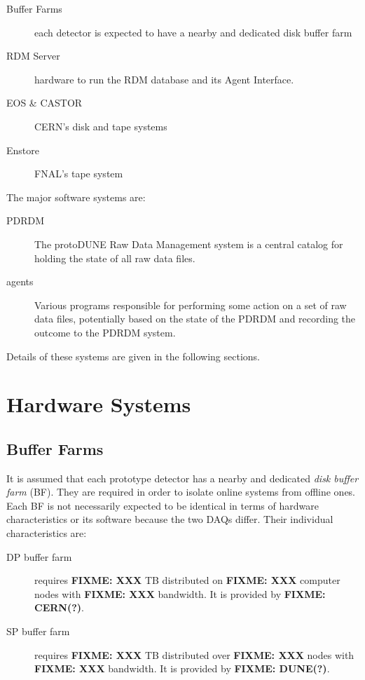 \documentclass[pdftex,12pt,letter]{article}
\newcommand{\fixme}[1]{\textbf{FIXME: #1}}
\begin{document}
\begin{description}
\item[Buffer Farms] each detector is expected to have a nearby and
  dedicated disk buffer farm
\item[RDM Server] hardware to run the RDM database and its Agent Interface.
\item[EOS \& CASTOR] CERN's disk and tape systems
\item[Enstore] FNAL's tape system

\end{description}

\noindent The major software systems are:

\begin{description}
\item[PDRDM] The protoDUNE Raw Data Management system is a central
  catalog for holding the state of all raw data files.
\item[agents] Various programs responsible for performing some action
  on a set of raw data files, potentially based on the state of the
  PDRDM and recording the outcome to the PDRDM system.
\end{description}

\noindent Details of these systems are given in the following sections.

\section{Hardware Systems}

\subsection{Buffer Farms}

It is assumed that each prototype detector has a nearby and dedicated
\textit{disk buffer farm} (BF).  They are required in order to isolate
online systems from offline ones.  Each BF is not necessarily expected
to be identical in terms of hardware characteristics or its software
because the two DAQs differ.  Their individual characteristics are:

\begin{description}
\item[DP buffer farm] requires \fixme{XXX} TB distributed on
  \fixme{XXX} computer nodes with \fixme{XXX} bandwidth.  It is
  provided by \fixme{CERN(?)}.
\item[SP buffer farm] requires \fixme{XXX} TB distributed over
  \fixme{XXX} nodes with \fixme{XXX} bandwidth.  It is provided by
  \fixme{DUNE(?)}.
\end{description}
\end{document}
